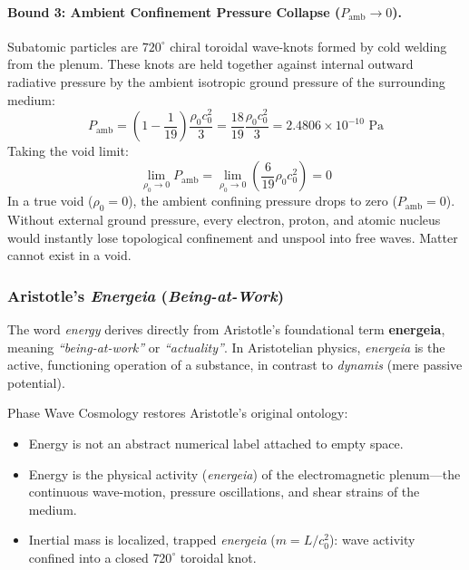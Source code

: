 \documentclass[11pt,a4paper]{article}
\begin{document}
\paragraph{Bound 3: Ambient Confinement Pressure Collapse ($P_{\text{amb}} \to 0$).}
Subatomic particles are $720^\circ$ chiral toroidal wave-knots formed by cold welding from the plenum. These knots are held together against internal outward radiative pressure by the ambient isotropic ground pressure of the surrounding medium:
\begin{equation}
P_{\text{amb}} = \left( 1 - \frac{1}{19} \right) \frac{\rho_0 c_0^2}{3} = \frac{18}{19} \frac{\rho_0 c_0^2}{3} = 2.4806 \times 10^{-10}\text{ Pa}
\end{equation}
Taking the void limit:
\begin{equation}
\lim_{\rho_0 \to 0} P_{\text{amb}} = \lim_{\rho_0 \to 0} \left( \frac{6}{19} \rho_0 c_0^2 \right) = 0
\end{equation}
In a true void ($\rho_0 = 0$), the ambient confining pressure drops to zero ($P_{\text{amb}} = 0$). Without external ground pressure, every electron, proton, and atomic nucleus would instantly lose topological confinement and unspool into free waves. Matter cannot exist in a void.

\subsubsection{Aristotle's \textit{Energeia} (\textit{Being-at-Work})}

The word \textit{energy} derives directly from Aristotle's foundational term \textbf{energeia}, meaning \textit{``being-at-work''} or \textit{``actuality''}. In Aristotelian physics, \textit{energeia} is the active, functioning operation of a substance, in contrast to \textit{dynamis} (mere passive potential).

Phase Wave Cosmology restores Aristotle's original ontology:
\begin{itemize}
    \item Energy is not an abstract numerical label attached to empty space.
    \item Energy is the physical activity (\textit{energeia}) of the electromagnetic plenum---the continuous wave-motion, pressure oscillations, and shear strains of the medium.
    \item Inertial mass is localized, trapped \textit{energeia} ($m = L/c_0^2$): wave activity confined into a closed $720^\circ$ toroidal knot.
\end{itemize}
\end{document}

